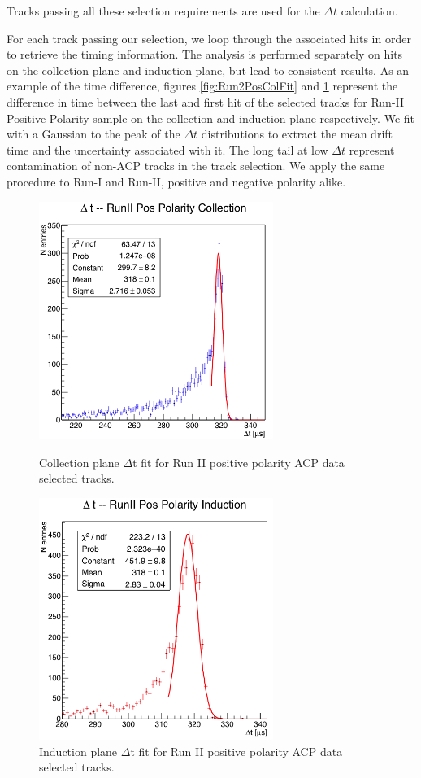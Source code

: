 Tracks passing all these selection requirements are used for the $\Delta t$ calculation.

For each track passing our selection, we loop through the associated hits in order to retrieve the timing information. The analysis is performed separately on hits on the collection plane and induction plane, but lead to consistent results. As an example of the time difference, figures \ref{fig:Run2PosColFit} and \ref{fig:Run2PosIndFit} represent the difference in time between the last and first hit of the selected tracks for Run-II Positive Polarity sample on the collection and induction plane respectively.  We fit with a Gaussian to the peak of the $\Delta t$ distributions to extract the mean drift time and the uncertainty associated with it. The long tail at low $\Delta t$ represent contamination of non-ACP tracks in the track selection.  We apply the same procedure to Run-I and Run-II, positive and negative polarity alike.

   
\begin{figure}[h!]
\begin{minipage}{0.40\textwidth}
\centering
\includegraphics[width=3in]{AppendixB-EField/Images/RunIIPosCol.png}
\caption{Collection plane $\Delta$t fit for Run II positive polarity ACP data  selected tracks.}
\label{fig:Run2PosColFit}
\end{minipage}\hfill
\begin{minipage}{0.40\textwidth}
\centering
\includegraphics[width=3in]{AppendixB-EField/Images/RunIIPosInd.png}
\caption{Induction plane $\Delta$t fit for Run II positive polarity ACP data  selected tracks.}
\label{fig:Run2PosIndFit}
\end{minipage}
\end{figure}

